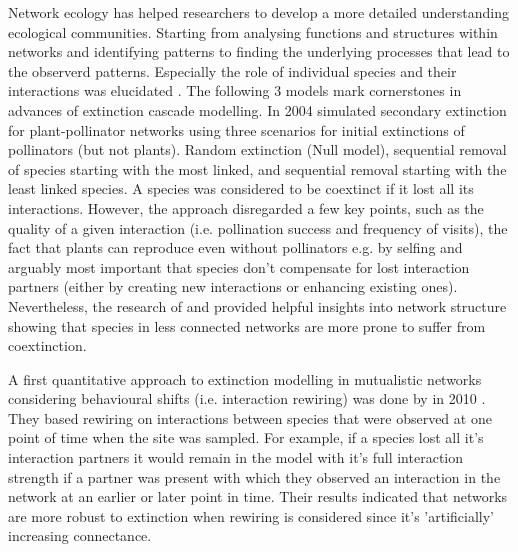 \documentclass[12pt,a4paper]{article}
\begin{document}

%
Network ecology has helped researchers to develop a more detailed understanding ecological communities. Starting from analysing functions and structures within networks and identifying patterns \parencite{Thebault2010} to finding the underlying processes that lead to the observerd patterns. Especially the role of individual species and their interactions was elucidated \parencite{Waser1996, Lau2017}. 
The following 3 models mark cornerstones in advances of extinction cascade modelling. In 2004 \citeauthor{Memmott2004} simulated secondary extinction for plant-pollinator networks using three scenarios for initial extinctions of pollinators (but not plants). Random extinction (Null model), sequential removal of species starting with the most linked, and sequential removal starting with the least linked species. A species was considered to be coextinct if it lost all its interactions. However, the approach disregarded a few key points, such as the quality of a given interaction (i.e. pollination success and frequency of visits), the fact that plants can reproduce even without pollinators e.g. by selfing and arguably most important that species don't compensate for lost interaction partners (either by creating new interactions or enhancing existing ones). Nevertheless, the research of \citeauthor{Dunne2002} and \citeauthor{Memmott2004} provided helpful insights into network structure showing that species in less connected networks are more prone to suffer from coextinction. \par

A first quantitative approach to extinction modelling in mutualistic networks considering behavioural shifts (i.e. interaction rewiring) was done by \citeauthor{Kaiser-Bunbury2010} in 2010 \parencite{Kaiser-Bunbury2010}. They based rewiring on interactions between species that were observed at one point of time when the site was sampled. For example, if a species lost all it's interaction partners it would remain in the model with it's full interaction strength if a partner was present with which they observed an interaction in the network at an earlier or later point in time. Their results indicated that networks are more robust to extinction when rewiring is considered since it's 'artificially' increasing connectance. \par
\end{document}
